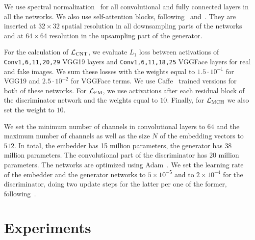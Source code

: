 \documentclass[10pt,twocolumn,letterpaper]{article}
\begin{document}
We use spectral normalization~\cite{Miyato18b} for all convolutional and fully connected layers in all the networks. We also use self-attention blocks, following~\cite{Brock18} and~\cite{Zhang18b}. They are inserted at $32 \times 32$ spatial resolution in all downsampling parts of the networks and at $64 \times 64$ resolution in the upsampling part of the generator.

For the calculation of $\mathcal{L}_\text{CNT}$, we evaluate $L_1$ loss between activations of \texttt{Conv1,6,11,20,29} VGG19 layers and \texttt{Conv1,6,11,18,25} VGGFace layers for real and fake images. We sum these losses with the weights equal to $1.5\cdot10^{-1}$ for VGG19 and $2.5\cdot10^{-2}$ for VGGFace terms. We use Caffe~\cite{Jia14} trained versions for both of these networks. For $\mathcal{L}_\text{FM}$, we use activations after each residual block of the discriminator network and the weights equal to $10$. Finally, for $\mathcal{L}_\text{MCH}{}$ we also set the weight to $10$.

We set the minimum number of channels in convolutional layers to $64$ and the maximum number of channels as well as the size $N$ of the embedding vectors to $512$. In total, the embedder has 15 million parameters, the generator has 38 million parameters. The convolutional part of the discriminator has 20 million parameters. The networks are optimized using Adam~\cite{Diederik14}. We set the learning rate of the embedder and the generator networks to $5\times10^{-5}$ and to $2\times10^{-4}$ for the discriminator, doing two update steps for the latter per one of the former, following~\cite{Zhang18b}.

%
 \section{Experiments}
\end{document}
